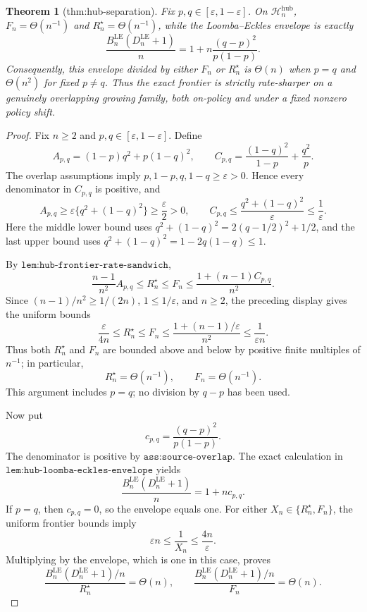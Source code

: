 \documentclass{article}
\newtheorem{theorem}{Theorem}
\begin{document}
\begin{theorem}[thm:hub-separation]\label{thm:hub-separation}
Fix \(p,q\in[\varepsilon,1-\varepsilon]\). On \(\mathcal H_n^{\mathrm{hub}}\), \(F_n=\Theta(n^{-1})\) and \(R_n^{\star}=\Theta(n^{-1})\), while the Loomba--Eckles envelope is exactly
\[
 \frac{B_n^{\mathrm{LE}}(D_n^{\mathrm{LE}}+1)}{n}
 =1+n\frac{(q-p)^2}{p(1-p)}.
\]
Consequently, this envelope divided by either \(F_n\) or \(R_n^{\star}\) is \(\Theta(n)\) when \(p=q\) and \(\Theta(n^2)\) for fixed \(p\ne q\). Thus the exact frontier is strictly rate-sharper on a genuinely overlapping growing family, both on-policy and under a fixed nonzero policy shift.
\end{theorem}
\begin{proof}
Fix \(n\ge 2\) and \(p,q\in[\varepsilon,1-\varepsilon]\).  Define
\[
 A_{p,q}=(1-p)q^2+p(1-q)^2,
 \qquad
 C_{p,q}=\frac{(1-q)^2}{1-p}+\frac{q^2}{p}.
\]
The overlap assumptions imply \(p,1-p,q,1-q\ge\varepsilon>0\).  Hence every denominator in \(C_{p,q}\) is positive, and
\[
 A_{p,q}
 \ge \varepsilon\{q^2+(1-q)^2\}
 \ge \frac{\varepsilon}{2}>0,
 \qquad
 C_{p,q}
 \le \frac{q^2+(1-q)^2}{\varepsilon}
 \le \frac1\varepsilon.
\]
Here the middle lower bound uses
\(q^2+(1-q)^2=2(q-1/2)^2+1/2\), and the last upper bound uses
\(q^2+(1-q)^2=1-2q(1-q)\le1\).

By \(\texttt{lem:hub-frontier-rate-sandwich}\),
\[
 \frac{n-1}{n^2}A_{p,q}
 \le R_n^{\star}\le F_n
 \le \frac{1+(n-1)C_{p,q}}{n^2}.
\]
Since \((n-1)/n^2\ge1/(2n)\), \(1\le1/\varepsilon\), and \(n\ge2\), the preceding display gives the uniform bounds
\[
 \frac{\varepsilon}{4n}
 \le R_n^{\star}\le F_n
 \le \frac{1+(n-1)/\varepsilon}{n^2}
 \le \frac1{\varepsilon n}.
\]
Thus both \(R_n^{\star}\) and \(F_n\) are bounded above and below by positive finite multiples of \(n^{-1}\); in particular,
\[
 R_n^{\star}=\Theta(n^{-1}),
 \qquad
 F_n=\Theta(n^{-1}).
\]
This argument includes \(p=q\); no division by \(q-p\) has been used.

Now put
\[
 c_{p,q}=\frac{(q-p)^2}{p(1-p)}.
\]
The denominator is positive by \(\texttt{ass:source-overlap}\).  The exact calculation in
\(\texttt{lem:hub-loomba-eckles-envelope}\) yields
\[
 \frac{B_n^{\mathrm{LE}}(D_n^{\mathrm{LE}}+1)}{n}
 =1+n c_{p,q}.
\]
If \(p=q\), then \(c_{p,q}=0\), so the envelope equals one.  For either
\(X_n\in\{R_n^{\star},F_n\}\), the uniform frontier bounds imply
\[
 \varepsilon n
 \le \frac1{X_n}
 \le \frac{4n}{\varepsilon}.
\]
Multiplying by the envelope, which is one in this case, proves
\[
 \frac{B_n^{\mathrm{LE}}(D_n^{\mathrm{LE}}+1)/n}{R_n^{\star}}
 =\Theta(n),
 \qquad
 \frac{B_n^{\mathrm{LE}}(D_n^{\mathrm{LE}}+1)/n}{F_n}
 =\Theta(n).
\]


\end{proof}
\end{document}
